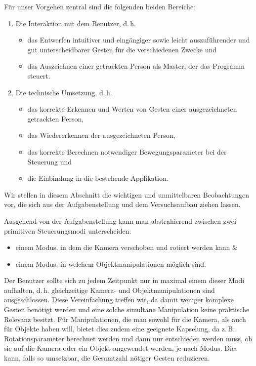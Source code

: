 	Für unser Vorgehen zentral sind die folgenden beiden Bereiche:
	\begin{enumerate}[label=(\roman*)]
		\item Die Interaktion mit dem Benutzer, d.\,h.
		\begin{itemize}
		\item das Entwerfen intuitiver und eingängiger sowie leicht auszuführender und gut unterscheidbarer Gesten für die verschiedenen Zwecke und
		\item das Auszeichnen einer getrackten Person als \glqq Master\grqq, der das Programm steuert.
		\end{itemize}
		\item Die technische Umsetzung, d.\,h.
		\begin{itemize}
		\item das korrekte Erkennen und Werten von Gesten einer ausgezeichneten getrackten Person,
		\item das Wiedererkennen der ausgezeichneten Person,
		\item das korrekte Berechnen notwendiger Bewegungsparameter bei der Steuerung und
		\item die Einbindung in die bestehende Applikation.
		\end{itemize}
	\end{enumerate}
	Wir stellen in diesem Abschnitt die wichtigen und unmittelbaren Beobachtungen vor, die sich aus der Aufgabenstellung und dem Versuchsaufbau ziehen lassen.\par\bigskip
	Ausgehend von der Aufgabenstellung kann man abstrahierend zwischen zwei primitiven Steuerungsmodi unterscheiden:
	\begin{itemize}
	\item einem Modus, in dem die Kamera verschoben und rotiert werden kann \&
	\item einem Modus, in welchem Objektmanipulationen möglich sind.
	\end{itemize}
	Der Benutzer sollte sich zu jedem Zeitpunkt nur in maximal einem dieser Modi aufhalten, d.\,h. gleichzeitige Kamera- und Objektmanipulationen sind ausgeschlossen. Diese Vereinfachung treffen wir, da damit weniger komplexe Gesten benötigt werden und eine solche simultane Manipulation keine praktische Relevanz besitzt. Für Manipulationen, die man sowohl für die Kamera, als auch für Objekte haben will, bietet dies zudem eine geeignete Kapselung, da z.\,B. Rotationsparameter berechnet werden und dann nur entschieden werden muss, ob sie auf die Kamera oder ein Objekt angewendet werden, je nach Modus. Dies kann, falls so umsetzbar, die Gesamtzahl nötiger Gesten reduzieren.\par\medskip
